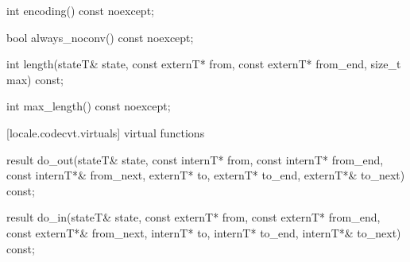 \begin{itemdescr}
\pnum
\returns
{}
\end{itemdescr}

%
%
\begin{itemdecl}
int encoding() const noexcept;
\end{itemdecl}

\begin{itemdescr}
\pnum
\returns
{}
\end{itemdescr}

%
%
\begin{itemdecl}
bool always_noconv() const noexcept;
\end{itemdecl}

\begin{itemdescr}
\pnum
\returns
{}
\end{itemdescr}

%
%
\begin{itemdecl}
int length(stateT& state, const externT* from, const externT* from_end,
           size_t max) const;
\end{itemdecl}

\begin{itemdescr}
\pnum
\returns
{}
\end{itemdescr}

%
%
\begin{itemdecl}
int max_length() const noexcept;
\end{itemdecl}

\begin{itemdescr}
\pnum
\returns
{}
\end{itemdescr}

[locale.codecvt.virtuals]{ virtual functions}

%
%
%
%
\begin{itemdecl}
result do_out(stateT& state,
  const internT* from, const internT* from_end, const internT*& from_next,
  externT* to, externT* to_end, externT*& to_next) const;

result do_in(stateT& state,
  const externT* from, const externT* from_end, const externT*& from_next,
        internT* to, internT* to_end, internT*& to_next) const;
\end{itemdecl}

